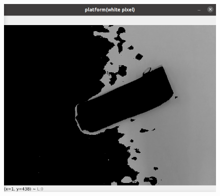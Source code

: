 \documentclass[fontset=fandol,type=bachelor,campus=harbin,bsmainpagenumberline=true]{hithesisbook}
\begin{document}
\begin{figure}[h]
{\begin{minipage}[h]{0.45\textwidth}
   		 	\includegraphics[width=1\textwidth]{chapter4/图像处理抑制边缘干扰b}
    		\end{minipage}
		\label{图像处理抑制边缘干扰b}
    	}
	\\ 
\end{figure}
\end{document}
